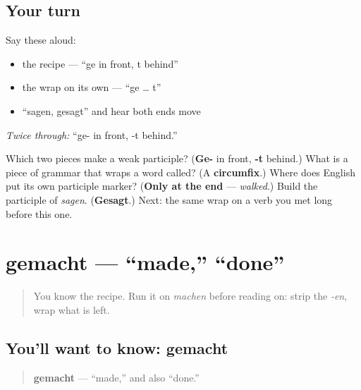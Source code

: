 \subsection*{Your turn}
Say these aloud:

\begin{itemize}
\raggedright
  \item the recipe — \textquotedblleft{}ge in front, t behind\textquotedblright{}
  \item the wrap on its own — \textquotedblleft{}ge … t\textquotedblright{}
  \item \textquotedblleft{}sagen, gesagt\textquotedblright{} and hear both ends move
\end{itemize}

\emph{Twice through:} \textquotedblleft{}ge- in front, -t behind.\textquotedblright{}

\begin{tcolorbox}[breakable,colback=teal!4,colframe=teal!35!black,title={Before you move on}]
Which two pieces make a weak participle? (\textbf{Ge-} in front, \textbf{-t} behind.) What is a piece of grammar that wraps a word called? (A \textbf{circumfix}.) Where does English put its own participle marker? (\textbf{Only at the end} — \emph{walked}.) Build the participle of \emph{sagen}. (\textbf{Gesagt}.) Next: the same wrap on a verb you met long before this one.
\end{tcolorbox}
\section[gemacht]{gemacht — \textquotedblleft{}made,\textquotedblright{} \textquotedblleft{}done\textquotedblright{}}

\label{lesson:GE-C15-gemacht}



\begin{quote}
You know the recipe. Run it on \emph{machen} before reading on: strip the \emph{-en}, wrap what is left.
\end{quote}

\subsection*{You'll want to know: gemacht}
\begin{quote}
\textbf{gemacht} — \textquotedblleft{}made,\textquotedblright{} and also \textquotedblleft{}done.\textquotedblright{}
\end{quote}

